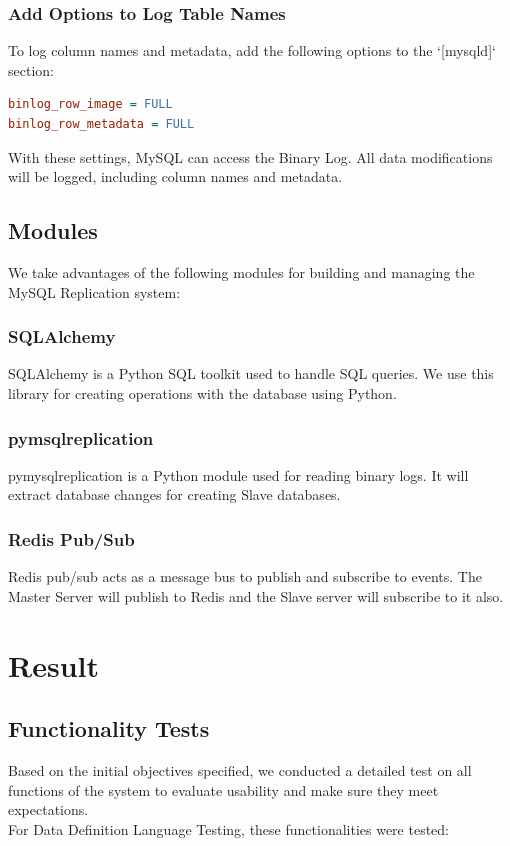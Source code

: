 \documentclass[a4paper,12pt]{report}
\begin{document}
\subsubsection{Add Options to Log Table Names}
To log column names and metadata, add the following options to the `[mysqld]` section:
\begin{lstlisting}[language=ini, numbers=none]
binlog_row_image = FULL
binlog_row_metadata = FULL
\end{lstlisting}

With these settings, MySQL can access the Binary Log. All data modifications will be logged, including column names and metadata.


\subsection{Modules}
We take advantages of the following modules for building and managing the MySQL Replication system:
\subsubsection{SQLAlchemy}
SQLAlchemy is a Python SQL toolkit used to handle SQL queries. We use this library for creating operations with the database using Python.

\subsubsection{pymsqlreplication}
pymysqlreplication is a Python module used for reading binary logs. It will extract database changes for creating Slave databases. 

\subsubsection{Redis Pub/Sub}
Redis pub/sub acts as a message bus to publish and subscribe to events. The Master Server will publish to Redis and the Slave server will subscribe to it also.

\setcounter{secnumdepth}{3}
\newpage
\section{\bfseries Result}
\fontsize{13}{16}\selectfont

\subsection{Functionality Tests}
Based on the initial objectives specified, we conducted a detailed test on all functions of the system to evaluate usability and make sure they meet expectations.
\vspace{1\baselineskip}
\\
For Data Definition Language Testing, these functionalities were tested:
\end{document}
